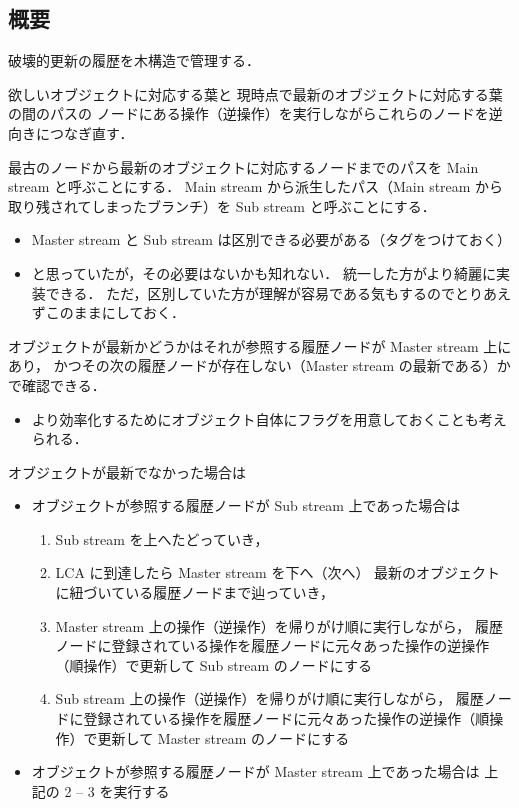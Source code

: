 \documentclass[10pt, a4j, twocolumn]{scrartcl}
\begin{document}
\subsection{概要}
\label{sec:orgf05d686}

破壊的更新の履歴を木構造で管理する．

欲しいオブジェクトに対応する葉と
現時点で最新のオブジェクトに対応する葉の間のパスの
ノードにある操作（逆操作）を実行しながらこれらのノードを逆向きにつなぎ直す．

最古のノードから最新のオブジェクトに対応するノードまでのパスを
Main stream と呼ぶことにする．
Main stream から派生したパス（Main stream から取り残されてしまったブランチ）を
Sub stream と呼ぶことにする．
\begin{itemize}
\item Master stream と Sub stream は区別できる必要がある（タグをつけておく）
\item と思っていたが，その必要はないかも知れない．
統一した方がより綺麗に実装できる．
ただ，区別していた方が理解が容易である気もするのでとりあえずこのままにしておく．
\end{itemize}



オブジェクトが最新かどうかはそれが参照する履歴ノードが Master stream 上にあり，
かつその次の履歴ノードが存在しない（Master stream の最新である）かで確認できる．
\begin{itemize}
\item より効率化するためにオブジェクト自体にフラグを用意しておくことも考えられる．
\end{itemize}


オブジェクトが最新でなかった場合は
\begin{itemize}
\item オブジェクトが参照する履歴ノードが Sub stream 上であった場合は
\begin{enumerate}
\item Sub stream を上へたどっていき，
\item LCA に到達したら Master stream を下へ（次へ）
最新のオブジェクトに紐づいている履歴ノードまで辿っていき，
\item Master stream 上の操作（逆操作）を帰りがけ順に実行しながら，
履歴ノードに登録されている操作を履歴ノードに元々あった操作の逆操作（順操作）で更新して
Sub stream のノードにする
\item Sub stream 上の操作（逆操作）を帰りがけ順に実行しながら，
履歴ノードに登録されている操作を履歴ノードに元々あった操作の逆操作（順操作）で更新して
Master stream のノードにする
\end{enumerate}
\item オブジェクトが参照する履歴ノードが Master stream 上であった場合は
上記の 2 -- 3 を実行する
\end{itemize}
\end{document}
